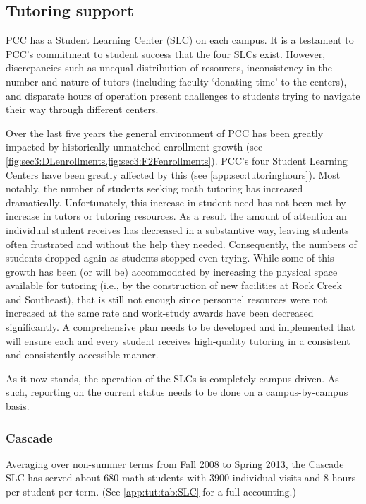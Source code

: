 \subsection{Tutoring support}
PCC has a Student Learning Center (SLC) on each campus.
It is a testament to PCC's commitment to student success that the four SLCs exist.
However, discrepancies such as unequal distribution of resources, inconsistency in the number and nature of tutors (including faculty `donating time' to the centers), and disparate hours of operation present challenges to students trying to navigate their way through different centers.


Over the last five years the general environment of PCC has been greatly impacted by historically-unmatched enrollment growth (see \vref{fig:sec3:DLenrollments,fig:sec3:F2Fenrollments}).
PCC's four Student Learning Centers have been greatly affected by this (see \vref{app:sec:tutoringhours}).
Most notably, the number of students seeking math tutoring has increased dramatically.
Unfortunately, this increase in student need has not been met by increase in tutors or tutoring resources.
As a result the amount of attention an individual student receives has decreased in a substantive way, leaving students often frustrated and without the help they needed.
Consequently, the numbers of students dropped again as students stopped even trying.
While some of this growth has been (or will be) accommodated by increasing the physical space available for tutoring (i.e., by the construction of new facilities at Rock Creek and Southeast), that is still not enough since personnel resources were not increased at the same rate and work-study awards have been decreased significantly.
A comprehensive plan needs to be developed and implemented that will ensure each and every student receives high-quality tutoring in a consistent and consistently accessible manner.

As it now stands, the operation of the SLCs is completely campus driven.
As such, reporting on the current status needs to be done on a campus-by-campus basis.

\subsubsection{Cascade}
Averaging over non-summer terms from Fall 2008 to Spring 2013, the Cascade SLC has served about 680 math students with 3900 individual visits and 8 hours per student per term.
(See \vref{app:tut:tab:SLC} for a full accounting.)

